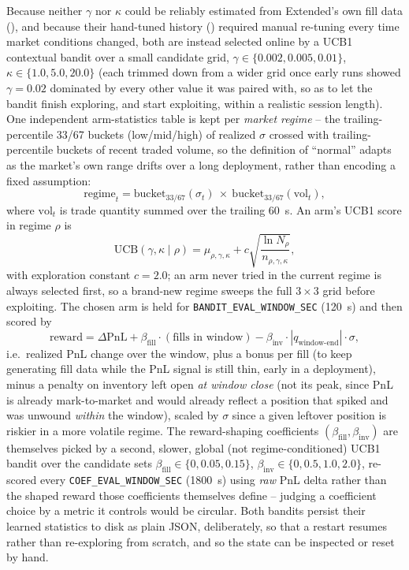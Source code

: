 \documentclass[11pt,a4paper]{article}
\begin{document}
Because neither $\gamma$ nor $\kappa$ could be reliably estimated from Extended's own fill data
(), and because their hand-tuned history () required
manual re-tuning every time market conditions changed, both are instead selected online by a
UCB1 contextual bandit \cite{auer2002} over a small candidate grid,
$\gamma\in\{0.002,0.005,0.01\}$, $\kappa\in\{1.0,5.0,20.0\}$ (each trimmed down from a wider grid
once early runs showed $\gamma=0.02$ dominated by every other value it was paired with, so as to
let the bandit finish exploring, and start exploiting, within a realistic session length). One
independent arm-statistics table is kept per \emph{market regime} -- the trailing-percentile
33/67 buckets (low/mid/high) of realized $\sigma$ crossed with trailing-percentile buckets of
recent traded volume, so the definition of ``normal'' adapts as the market's own range drifts over
a long deployment, rather than encoding a fixed assumption:
\begin{equation}
  \text{regime}_t = \text{bucket}_{33/67}(\sigma_t)\ \times\ \text{bucket}_{33/67}(\text{vol}_t),
\end{equation}
where $\text{vol}_t$ is trade quantity summed over the trailing \SI{60}{\second}. An arm's UCB1
score in regime $\rho$ is
\begin{equation}
  \text{UCB}(\gamma,\kappa\mid\rho) = \hat\mu_{\rho,\gamma,\kappa} +
    c\sqrt{\frac{\ln N_\rho}{n_{\rho,\gamma,\kappa}}},
\end{equation}
with exploration constant $c=2.0$; an arm never tried in the current regime is always selected
first, so a brand-new regime sweeps the full $3\times3$ grid before exploiting. The chosen arm is
held for \texttt{BANDIT\_EVAL\_WINDOW\_SEC} (\SI{120}{\second}) and then scored by
\begin{equation}
  \text{reward} = \Delta\text{PnL} + \beta_{\text{fill}}\cdot(\text{fills in window})
    - \beta_{\text{inv}}\cdot|q_{\text{window-end}}|\cdot\sigma,
  \label{eq:reward}
\end{equation}
i.e.\ realized PnL change over the window, plus a bonus per fill (to keep generating fill data
while the PnL signal is still thin, early in a deployment), minus a penalty on inventory left open
\emph{at window close} (not its peak, since PnL is already mark-to-market and would already
reflect a position that spiked and was unwound \emph{within} the window), scaled by $\sigma$ since
a given leftover position is riskier in a more volatile regime. The reward-shaping coefficients
$(\beta_{\text{fill}}, \beta_{\text{inv}})$ are themselves picked by a second, slower, global (not
regime-conditioned) UCB1 bandit over the candidate sets $\beta_{\text{fill}}\in\{0,0.05,0.15\}$,
$\beta_{\text{inv}}\in\{0,0.5,1.0,2.0\}$, re-scored every \texttt{COEF\_EVAL\_WINDOW\_SEC}
(\SI{1800}{\second}) using \emph{raw} PnL delta rather than the shaped reward those coefficients
themselves define -- judging a coefficient choice by a metric it controls would be circular. Both
bandits persist their learned statistics to disk as plain JSON, deliberately, so that a
restart resumes rather than re-exploring from scratch, and so the state can be inspected or reset
by hand.
\end{document}

